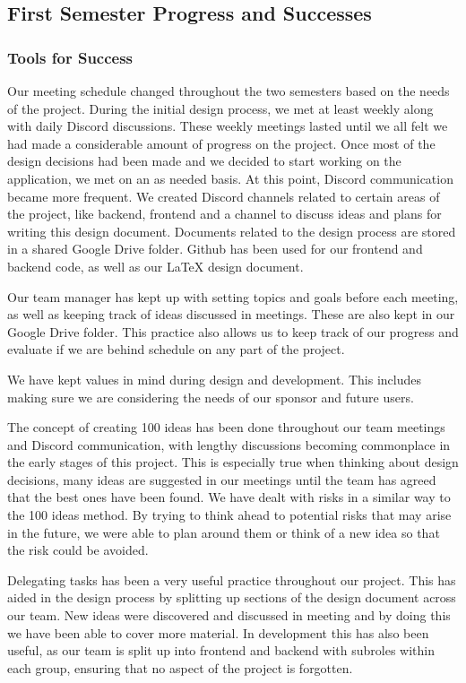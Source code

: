 \subsection{First Semester Progress and Successes}
\subsubsection{Tools for Success}
Our meeting schedule changed throughout the two semesters based on the needs of the project. During the initial design process, we met at least weekly along with daily Discord discussions. These weekly meetings lasted until we all felt we had made a considerable amount of progress on the project. Once most of the design decisions had been made and we decided to start working on the application, we met on an as needed basis. At this point, Discord communication became more frequent. We created Discord channels related to certain areas of the project, like backend, frontend and a channel to discuss ideas and plans for writing this design document. Documents related to the design process are stored in a shared Google Drive folder. Github has been used for our frontend and backend code, as well as our \LaTeX{} design document.\par
Our team manager has kept up with setting topics and goals before each meeting, as well as keeping track of ideas discussed in meetings. These are also kept in our Google Drive folder. This practice also allows us to keep track of our progress and evaluate if we are behind schedule on any part of the project.\par
We have kept values in mind during design and development. This includes making sure we are considering the needs of our sponsor and future users.\par
The concept of creating 100 ideas has been done throughout our team meetings and Discord communication, with lengthy discussions becoming commonplace in the early stages of this project. This is especially true when thinking about design decisions, many ideas are suggested in our meetings until the team has agreed that the best ones have been found. We have dealt with risks in a similar way to the 100 ideas method. By trying to think ahead to potential risks that may arise in the future, we were able to plan around them or think of a new idea so that the risk could be avoided.\par
Delegating tasks has been a very useful practice throughout our project. This has aided in the design process by splitting up sections of the design document across our team. New ideas were discovered and discussed in meeting and by doing this we have been able to cover more material. In development this has also been useful, as our team is split up into frontend and backend with subroles within each group, ensuring that no aspect of the project is forgotten.\par

